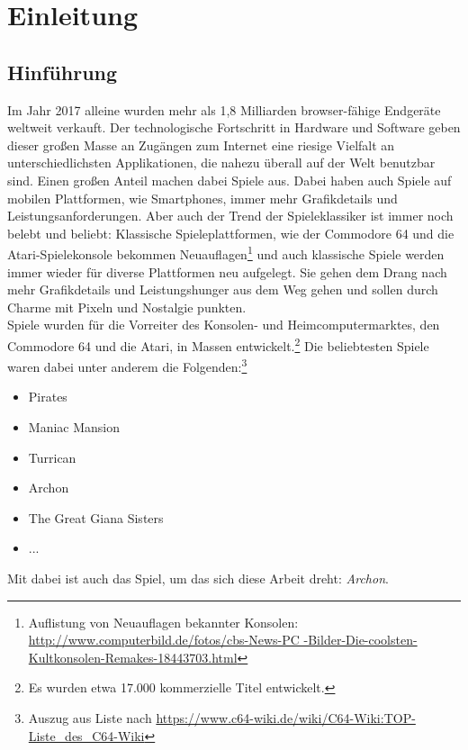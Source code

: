 \chapter{Einleitung}
\label{cha:Einleitung}

\section{Hinführung}
\label{sec:hinfuhrung}
Im Jahr 2017 alleine wurden mehr als 1,8 Milliarden browser-fähige Endgeräte weltweit verkauft.\cite{statista_absatz} Der technologische Fortschritt in Hardware und Software geben dieser großen Masse an Zugängen zum Internet eine riesige Vielfalt an unterschiedlichsten Applikationen, die nahezu überall auf der Welt benutzbar sind. Einen großen Anteil machen dabei Spiele aus. Dabei haben auch Spiele auf mobilen Plattformen, wie Smartphones, immer mehr Grafikdetails und Leistungsanforderungen. Aber auch der Trend der Spieleklassiker ist immer noch belebt und beliebt: Klassische Spieleplattformen, wie der Commodore 64 und die Atari-Spielekonsole bekommen Neuauflagen\footnote{Auflistung von Neuauflagen bekannter Konsolen:\\ \url{http://www.computerbild.de/fotos/cbs-News-PC
-Bilder-Die-coolsten-Kultkonsolen-Remakes-18443703.html}} und auch klassische Spiele werden immer wieder für diverse Plattformen neu aufgelegt. Sie gehen dem Drang nach mehr Grafikdetails und Leistungshunger aus dem Weg gehen und sollen durch Charme mit Pixeln und Nostalgie punkten.\\
Spiele wurden für die Vorreiter des Konsolen- und Heimcomputermarktes, den Commodore 64 und die Atari, in Massen entwickelt.\footnote{Es wurden etwa 17.000 kommerzielle Titel entwickelt.\cite{commodore64}}
Die beliebtesten Spiele waren dabei unter anderem die Folgenden:\footnote{Auszug aus Liste nach \url{https://www.c64-wiki.de/wiki/C64-Wiki:TOP-Liste_des_C64-Wiki}}
\begin{itemize}
	\item Pirates
	\item Maniac Mansion
	\item Turrican 
	\item Archon
	\item The Great Giana Sisters
	\item ...
\end{itemize}
Mit dabei ist auch das Spiel, um das sich diese Arbeit dreht: \emph{Archon}.\\
